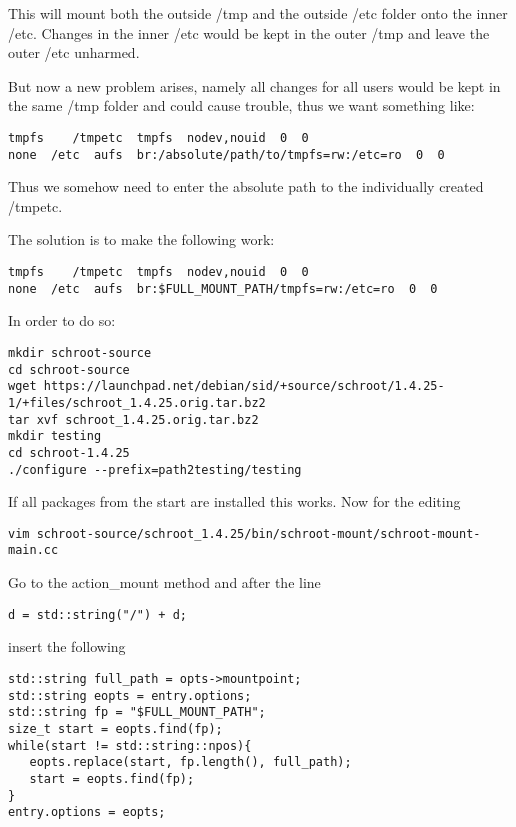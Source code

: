 \documentclass[a4paper]{book}
\begin{document}
This will mount both the outside /tmp and the outside /etc folder onto the
inner /etc. Changes in the inner /etc would be kept in the outer /tmp and leave
the outer /etc unharmed.

But now a new problem arises, namely all changes for all users would be kept in
the same /tmp folder and could cause trouble, thus we want something like:

\begin{verbatim}
tmpfs    /tmpetc  tmpfs  nodev,nouid  0  0
none  /etc  aufs  br:/absolute/path/to/tmpfs=rw:/etc=ro  0  0
\end{verbatim}

Thus we somehow need to enter the absolute path to the individually created /tmpetc.

The solution is to make the following work:

\begin{verbatim}
tmpfs    /tmpetc  tmpfs  nodev,nouid  0  0
none  /etc  aufs  br:$FULL_MOUNT_PATH/tmpfs=rw:/etc=ro  0  0
\end{verbatim}

In order to do so:

\begin{verbatim}
mkdir schroot-source
cd schroot-source
wget https://launchpad.net/debian/sid/+source/schroot/1.4.25-1/+files/schroot_1.4.25.orig.tar.bz2
tar xvf schroot_1.4.25.orig.tar.bz2
mkdir testing
cd schroot-1.4.25
./configure --prefix=path2testing/testing
\end{verbatim}

If all packages from the start are installed this works.
Now for the editing

\begin{verbatim}
vim schroot-source/schroot_1.4.25/bin/schroot-mount/schroot-mount-main.cc
\end{verbatim}

Go to the action\_mount method and after the line

\begin{verbatim}
d = std::string("/") + d;
\end{verbatim}

insert the following

\begin{verbatim}
std::string full_path = opts->mountpoint;
std::string eopts = entry.options;
std::string fp = "$FULL_MOUNT_PATH";
size_t start = eopts.find(fp);
while(start != std::string::npos){
   eopts.replace(start, fp.length(), full_path);
   start = eopts.find(fp);
}
entry.options = eopts;
\end{verbatim}
\end{document}

